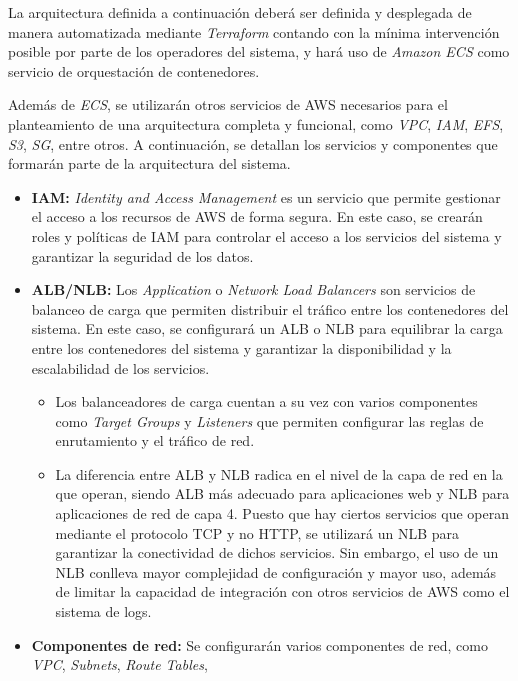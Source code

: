 La arquitectura definida a continuación deberá ser definida y desplegada de
manera automatizada mediante \textit{Terraform} contando con la mínima
intervención posible por parte de los operadores del sistema, y hará uso de
\textit{Amazon ECS} como servicio de orquestación de contenedores.

Además de \textit{ECS}, se utilizarán otros servicios de AWS necesarios para el
planteamiento de una arquitectura completa y funcional, como \textit{VPC},
\textit{IAM}, \textit{EFS}, \textit{S3}, \textit{SG}, entre otros. A
continuación, se detallan los servicios y componentes que formarán parte de la
arquitectura del sistema.

\begin{itemize}
	\item \textbf{IAM:} \textit{Identity and Access Management} es un servicio
		que permite gestionar el acceso a los recursos de AWS de forma segura.
		En este caso, se crearán roles y políticas de IAM para controlar el
		acceso a los servicios del sistema y garantizar la seguridad de los
		datos.
	\item \textbf{ALB/NLB:} Los \textit{Application} o \textit{Network Load
		Balancers} son servicios de balanceo de carga que permiten distribuir
		el tráfico entre los contenedores del sistema. En este caso, se
		configurará un ALB o NLB para equilibrar la carga entre los contenedores
		del sistema y garantizar la disponibilidad y la escalabilidad de los
		servicios. \begin{itemize}
			\item Los balanceadores de carga cuentan a su vez con varios
				componentes como \textit{Target Groups} y \textit{Listeners} que
				permiten configurar las reglas de enrutamiento y el tráfico de red.
			\item La diferencia entre ALB y NLB radica en el nivel de la capa
				de red en la que operan, siendo ALB más adecuado para
				aplicaciones web y NLB para aplicaciones de red de capa 4.
				Puesto que hay ciertos servicios que operan mediante el
				protocolo TCP y no HTTP, se utilizará un NLB para garantizar
				la conectividad de dichos servicios. Sin embargo, el uso de un
				NLB conlleva mayor complejidad de configuración y mayor uso,
				además de limitar la capacidad de integración con otros
				servicios de AWS como el sistema de logs.
		\end{itemize}
	\item \textbf{Componentes de red:} Se configurarán varios componentes de
		red, como \textit{VPC}, \textit{Subnets}, \textit{Route Tables},

\end{itemize}
